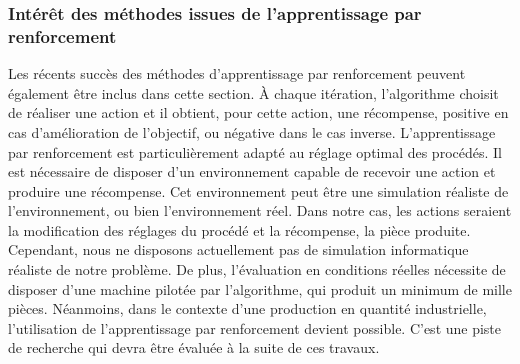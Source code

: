 
\subsubsection{Intérêt des méthodes issues de l'apprentissage par renforcement}
Les récents succès des méthodes d'apprentissage par renforcement peuvent également être inclus dans cette section.
À chaque itération, l'algorithme choisit de réaliser une action et il obtient, pour cette action, une récompense, positive en cas d'amélioration de l'objectif, ou négative dans le cas inverse.
L'apprentissage par renforcement est particulièrement adapté au réglage optimal des procédés.
Il est nécessaire de disposer d'un environnement capable de recevoir une action et produire une récompense.
Cet environnement peut être une simulation réaliste de l'environnement, ou bien l'environnement réel.
Dans notre cas, les actions seraient la modification des réglages du procédé et la récompense, la pièce produite.
Cependant, nous ne disposons actuellement pas de simulation informatique réaliste de notre problème. De plus, l'évaluation en conditions réelles nécessite de disposer d'une machine pilotée par l'algorithme, qui produit un minimum de mille pièces.
Néanmoins, dans le contexte d'une production en quantité industrielle, l'utilisation de l'apprentissage par renforcement devient possible. C'est une piste de recherche qui devra être évaluée à la suite de ces travaux.






